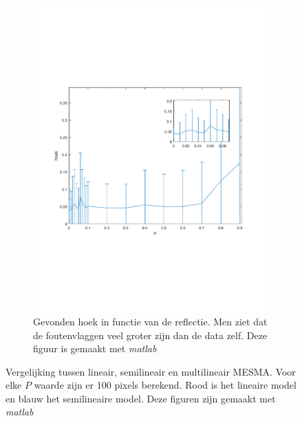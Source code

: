 \documentclass[12pt]{report}
\begin{document}
\begin{figure}
\begin{subfigure}[b]{0.5\textwidth}
\includegraphics[width=\textwidth,trim=0 200 0 175 cm]{PMC_AAM_10_100_angle.pdf}
\caption{Gevonden hoek in functie van de reflectie. Men ziet dat de foutenvlaggen veel groter zijn dan de data zelf. Deze figuur is gemaakt met \textit{matlab}\cite{matlab} \label{fig:Ahoek}}
\end{subfigure}
\caption{Vergelijking tussen lineair, semilineair en multilineair MESMA. Voor elke $P$ waarde zijn er 100 pixels berekend. Rood is het lineaire model en blauw het semilineaire model. Deze figuren zijn gemaakt met \textit{matlab}\cite{matlab}\label{fig:Ab100}}
\end{figure}
\end{document}
